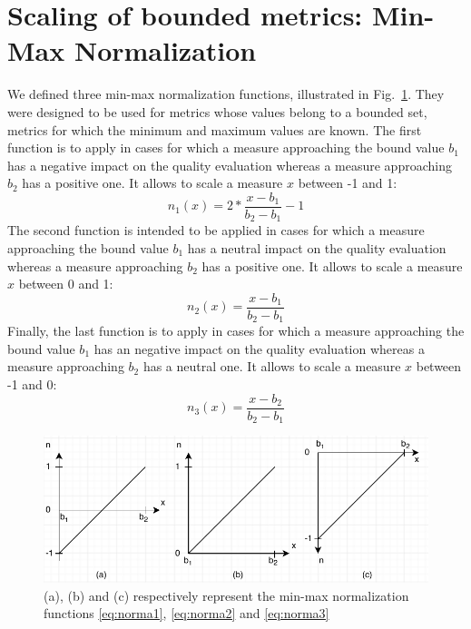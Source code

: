 \section{Scaling of bounded metrics: Min-Max Normalization} \label{subsubsec:norma} We defined three min-max normalization functions, illustrated in Fig.~\ref{fig:norma}. They were designed to be used for metrics whose values belong to a bounded set, \ie metrics for which the minimum and maximum values are known. The first function is to apply in cases for which a measure approaching the bound value $b_1$ has a negative impact on the quality evaluation whereas a measure approaching $b_2$ has a positive one. It allows to scale a measure $x$ between -1 and 1:
\begin{equation}\label{eq:norma1}
n_1(x) = 2 * \dfrac{x-b_1}{b_2-b_1} -1
\end{equation}
The second function is intended to be applied in cases for which a measure approaching the bound value $b_1$ has a neutral impact on the quality evaluation whereas a measure approaching $b_2$ has a positive one. It allows to scale a measure $x$ between 0 and 1:
\begin{equation}\label{eq:norma2}
n_2(x) = \dfrac{x-b_1}{b_2-b_1}
\end{equation}
Finally, the last function is to apply in cases for which a measure approaching the bound value $b_1$ has an negative impact on the quality evaluation whereas a measure approaching $b_2$ has a neutral one. It allows to scale a measure $x$ between -1 and 0:
\begin{equation}\label{eq:norma3}
n_3(x) = \dfrac{x-b_2}{b_2-b_1}
\end{equation}
\begin{figure}[!htp]
	\centering
	\includegraphics[width=\linewidth]{figures/annexe1/norma.pdf}
	\caption{(a), (b) and (c) respectively represent the min-max normalization functions \eqref{eq:norma1}, \eqref{eq:norma2} and \eqref{eq:norma3}}
	\label{fig:norma}
\end{figure}

